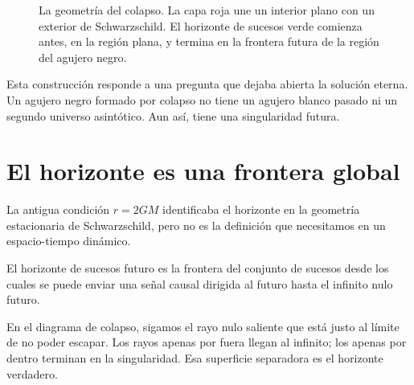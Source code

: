 \begin{figure}[htbp]
\centering
{}
\caption{La geometría del colapso. La capa roja une un interior plano con un exterior de Schwarzschild. El horizonte de sucesos verde comienza antes, en la región plana, y termina en la frontera futura de la región del agujero negro.}
\label{fig:l05-collapse}
\end{figure}

Esta construcción responde a una pregunta que dejaba abierta la solución eterna. Un agujero negro formado por colapso no tiene un agujero blanco pasado ni un segundo universo asintótico. Aun así, tiene una singularidad futura.

\section{El horizonte es una frontera global}

La antigua condición \(r=2GM\) identificaba el horizonte en la geometría estacionaria de Schwarzschild, pero no es la definición que necesitamos en un espacio-tiempo dinámico.

\begin{definition}
El horizonte de sucesos futuro es la frontera del conjunto de sucesos desde los cuales se puede enviar una señal causal dirigida al futuro hasta el infinito nulo futuro.
\end{definition}

En el diagrama de colapso, sigamos el rayo nulo saliente que está justo al límite de no poder escapar. Los rayos apenas por fuera llegan al infinito; los apenas por dentro terminan en la singularidad. Esa superficie separadora es el horizonte verdadero.

